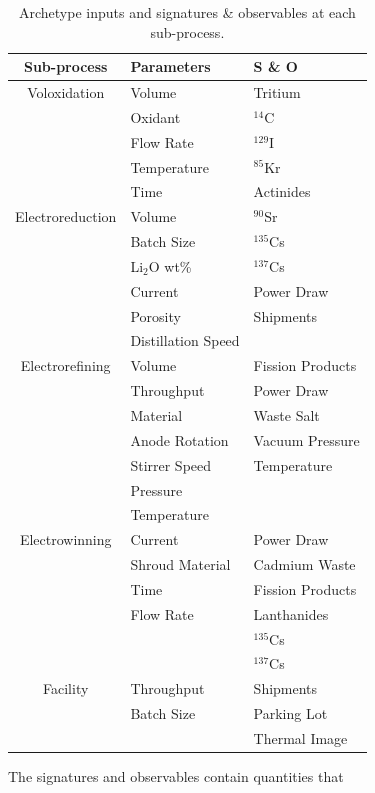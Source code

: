 \documentclass{anstrans}
\begin{document}
\begin{table}[h]
	\centering
	\begin{tabularx}{0.5\textwidth}{cll}
		\hline
		\textbf{Sub-process} & \textbf{Parameters} & \textbf{S \& O} \\
		\hline
		Voloxidation & Volume & Tritium \\
		& Oxidant & $^{14}$C \\
		& Flow Rate &  $^{129}$I\\
		& Temperature & $^{85}$Kr \\
		& Time & Actinides\\ \hline
		Electroreduction & Volume & $^{90}$Sr \\
		& Batch Size & $^{135}$Cs \\
		& Li$_2$O wt\% & $^{137}$Cs \\
		& Current & Power Draw \\
		& Porosity & Shipments \\
		& Distillation Speed & \\ \hline
		Electrorefining & Volume & Fission Products\\
		& Throughput & Power Draw \\
		& Material & Waste Salt \\
		& Anode Rotation & Vacuum Pressure\\
		& Stirrer Speed & Temperature \\
		& Pressure & \\
		& Temperature & \\ \hline
		Electrowinning & Current & Power Draw \\
		& Shroud Material & Cadmium Waste \\
		& Time & Fission Products \\
		& Flow Rate & Lanthanides \\
		&  & $^{135}$Cs \\
		&  & $^{137}$Cs \\ \hline
		Facility & Throughput & Shipments \\
		& Batch Size & Parking Lot \\
		& & Thermal Image \\
		\hline
	\end{tabularx}
	\caption {Archetype inputs and signatures \& observables at each sub-process.}
	\label {tab:pressure}
\end{table}

The signatures and observables contain quantities that 

\end{document}

